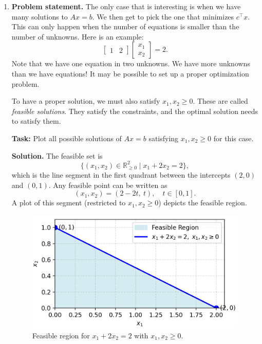 \documentclass[11pt]{article}
\begin{document}
\begin{enumerate}[label=\textbf{1(\alph*)}]
		\item \textbf{Problem statement.}
		The only case that is interesting is when we have many solutions to $Ax = b$. We then get to pick the one that minimizes $c^{\top}x$. This can only happen when the number of equations is smaller than the number of unknowns. Here is an example:
		\[
		\begin{bmatrix} 1 & 2 \end{bmatrix}
		\begin{bmatrix} x_1 \\ x_2 \end{bmatrix} = 2.
		\]
		Note that we have one equation in two unknowns. We have more unknowns than we have equations! It may be possible to set up a proper optimization problem.
		
		To have a proper solution, we must also satisfy $x_1, x_2 \ge 0$. These are called \emph{feasible solutions}. They satisfy the constraints, and the optimal solution needs to satisfy them.
		
		\textbf{Task:} Plot all possible solutions of $Ax = b$ satisfying $x_1, x_2 \ge 0$ for this case.
		
		\textbf{Solution.}
		The feasible set is
		\[
		\{(x_1,x_2)\in\mathbb{R}^2_{\ge 0} \mid x_1 + 2x_2 = 2\},
		\]
		which is the line segment in the first quadrant between the intercepts $(2,0)$ and $(0,1)$. Any feasible point can be written as
		\[
		(x_1,x_2) = (2-2t,\ t), \quad t\in[0,1].
		\]
		A plot of this segment (restricted to $x_1,x_2\ge 0$) depicts the feasible region.
		
		\begin{figure}[H]
			\centering
			\includegraphics[width=\textwidth]{1c.png}
			\caption{Feasible region for $x_1 + 2x_2 = 2$ with $x_1, x_2 \geq 0$.}
		\end{figure}
		

\end{enumerate}
\end{document}
